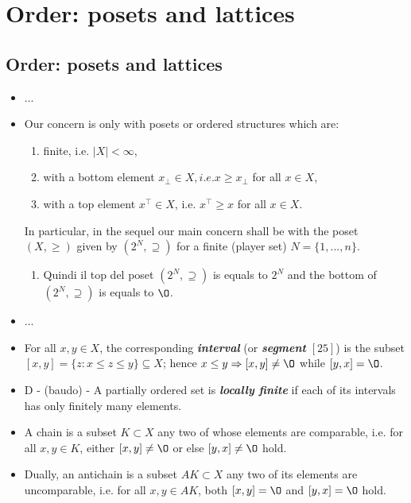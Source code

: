 \chapter{Order: posets and lattices}
\section{Order: posets and lattices}
\begin{itemize}
	\item ...
	
	\item Our concern is only with posets or ordered structures which are:
	  \begin{enumerate}
	    \item finite, i.e. $|X|<\infty$,
	    \item with a bottom element $x_{\bot} \in X, i.e. x \ge x_{\bot}$ for all $x \in X$,
	    \item with a top element $x^{\top} \in X$, i.e. $x^{\top} \ge x$ for all $x \in X$.
	  \end{enumerate}
	  In particular, in the sequel our main concern shall be with the poset $(X, \ge)$ given by $(2^N, \supseteq)$ for a finite (player set) $N = \{1,...,n\}$.
	    \begin{enumerate}
	     \item Quindi il top del poset $(2^N, \supseteq)$ is equals to $2^N$ and the bottom of $(2^N, \supseteq)$ is equals to $\O$. 
	    \end{enumerate}
	    
	\item ...
	
	\item For all $x, y \in X$, the corresponding \emph{\bfseries{interval}} (or \emph{\bfseries{segment}} $[25]$) is the subset $[x,y]=\{z:x \le z \le y\} \subseteq X$; hence $x \le y \Rightarrow [x,y] \ne \O$ while $[y,x] = \O$.
	
	\item D - (baudo) - A partially ordered set is \emph{\bf{locally finite}} if each of its intervals has only finitely many elements.
	
	\item A chain is a subset $K \subset X$ any two of whose elements are comparable, i.e. for all $x, y \in K$, either $[x,y] \ne \O$ or else $[y,x] \ne \O$ hold.
	
	\item Dually, an antichain is a subset $AK \subset X$ any two of its elements are uncomparable, i.e. for all $x,y \in AK$, both $[x,y]=\O$ and $[y,x]=\O$ hold.
	

\end{itemize}
